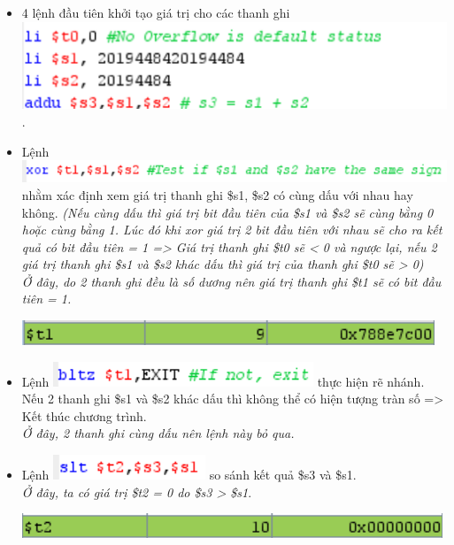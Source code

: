 \documentclass[12pt,a4paper,oneside]{article}
\begin{document}
\begin{itemize}
\item 4 lệnh đầu tiên khởi tạo giá trị cho các thanh ghi\quad \includegraphics[scale=1]{1.1}.
\item Lệnh \includegraphics[scale=1]{1.2} nhằm xác định xem giá trị thanh ghi \$s1, \$s2 có cùng dấu với nhau hay không. \textit{(Nếu cùng dấu thì giá trị bit đầu tiên của \$s1 và \$s2 sẽ cùng bằng 0 hoặc cùng bằng 1. Lúc đó khi xor giá trị 2 bit đầu tiên với nhau sẽ cho ra kết quả có bit đầu tiên = 1 => Giá trị thanh ghi \$t0 \linebreak sẽ < 0 và ngược lại, nếu 2 giá trị thanh ghi \$s1 và \$s2 khác dấu thì giá trị của thanh \linebreak ghi \$t0 sẽ > 0)}\\\textit{Ở đây, do 2 thanh ghi đều là số dương nên giá trị thanh ghi \$t1 sẽ có bit đầu tiên = 1.} \begin{center}
\includegraphics[scale=1]{1.4}
\end{center}
\item Lệnh \includegraphics[scale=1]{1.3} thực hiện rẽ nhánh. Nếu 2 thanh ghi \$s1 và \$s2 khác dấu thì không thể có hiện tượng tràn số => Kết thúc chương trình.\\\textit{Ở đây, 2 thanh ghi cùng dấu nên lệnh này bỏ qua.}
\item Lệnh \includegraphics[scale=1]{1.5} so sánh kết quả \$s3 và \$s1. \\\textit{Ở đây, ta có giá trị \$t2 = 0 do \$s3 > \$s1}.
\begin{center}
\includegraphics[scale=1]{1.6}

\end{center}
\end{itemize}
\end{document}
